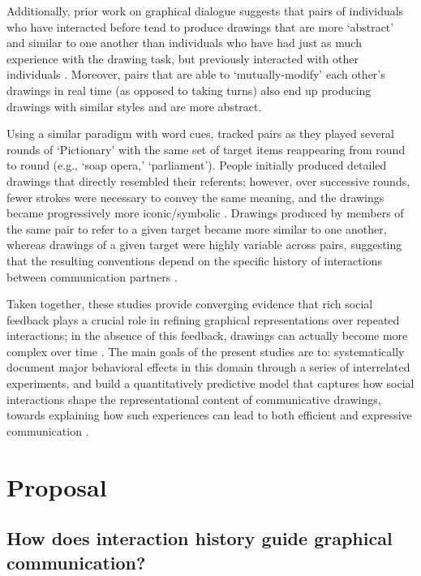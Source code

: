 \documentclass[12pt]{article}
\begin{document}
Additionally, prior work on graphical dialogue suggests that pairs of individuals who have interacted before tend to produce drawings that are more `abstract' and similar to one another than individuals who have had just as much experience with the drawing task, but previously interacted with other individuals \cite{Healey:2007vq}. Moreover, pairs that are able to `mutually-modify' each other's drawings in real time (as opposed to taking turns) also end up producing drawings with similar styles and are more abstract.  

Using a similar paradigm with word cues, \cite{Fay:2010jh} tracked pairs as they played several rounds of `Pictionary' with the same set of target items reappearing from round to round (e.g., `soap opera,' `parliament'). People initially produced detailed drawings that directly resembled their referents; however, over successive rounds, fewer strokes were necessary to convey the same meaning, and the drawings became progressively more iconic/symbolic \cite{Garrod:2007wk}. Drawings produced by members of the same pair to refer to a given target became more similar to one another, whereas drawings of a given target were highly variable across pairs, suggesting that the resulting conventions depend on the specific history of interactions between communication partners \cite{Fay:2010jh}.

Taken together, these studies provide converging evidence that rich social feedback plays a crucial role in refining graphical representations over repeated interactions; in the absence of this feedback, drawings can actually become more complex over time \cite{Garrod:2007wk,Hupet:1992ua}. The main goals of the present studies are to: systematically document major behavioral effects in this domain through a series of interrelated experiments, and build a quantitatively predictive model that captures how social interactions shape the representational content of communicative drawings, towards explaining how such experiences can lead to both efficient and expressive communication \cite{Kirby:2015gi}. 

\section{Proposal}

\subsection{How does interaction history guide graphical communication?}
\end{document}
